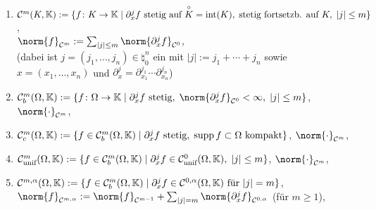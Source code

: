 \begin{Bsp}
\begin{enumerate}[label=\emph{(\alph*)}]
        \item
        $\mathcal{C}^m(K, \mathbb{K}) := \{f\colon K \rightarrow \mathbb{K} \;|\;
        \partial_x^j f \text{ stetig auf } \overset{\circ}{K} = \operatorname{int}(K),\;
        \text{stetig fortsetzb. auf } K,\; |j| \le m\}$,\\
        $\norm{f}_{\C^m} := \sum_{|j| \le m} \norm{\partial_x^j f}_{\C^0}$,
        \\
        (dabei ist $j = (j_1, \dotsc, j_n) \in \natural_0^n$ ein 
        mit $|j| := j_1 + \dotsb + j_n$
        sowie $x = (x_1, \dotsc, x_n)$ und
        $\partial_x^j = \partial_{x_1}^{j_1} \dotsb \partial_{x_n}^{j_n}$)
        
        \item
        $\C^m_b(\Omega, \KK) := \{f\colon \Omega \rightarrow \KK \;|\;
        \partial_x^j f \text{ stetig},\; \norm{\partial_x^j f}_{\C^0} < \infty,\; |j| \le m\}$,
        $\norm{\cdot}_{\C^m}$,\\
        
        \item
        $\mathcal{C}^m_c(\Omega, \mathbb{K}) := \{f \in \mathcal{C}^m_b(\Omega, \mathbb{K}) \;|\;
        \partial_x^j f \text{ stetig},\; \operatorname{supp} f \subset \Omega \text{ kompakt}\}$,
        $\norm{\cdot}_{\C^m}$,\\
        
        \item
        $\mathcal{C}^m_{\text{unif}}(\Omega, \mathbb{K}) := \{f \in \mathcal{C}^m_b(\Omega, \mathbb{K}) \;|\;
        \partial_x^j f \in \mathcal{C}^0_{\text{unif}}(\Omega, \mathbb{K}),\; |j| \le m\}$,
        $\norm{\cdot}_{\C^m}$,\\
        
        \item
        $\mathcal{C}^{m,\alpha}(\Omega, \mathbb{K}) := \{f \in \mathcal{C}^m_b(\Omega, \mathbb{K}) \;|\;
        \partial_x^j f \in \mathcal{C}^{0,\alpha}(\Omega, \mathbb{K}) \text{ für } |j| = m\}$,\\
        $\norm{f}_{\C^{m,\alpha}} := \norm{f}_{\C^{m-1}} +
        \sum_{|j|=m} \norm{\partial_x^j f}_{\C^{0,\alpha}}$ (für $m \ge 1$),\\
    \end{enumerate}
\end{Bsp}

